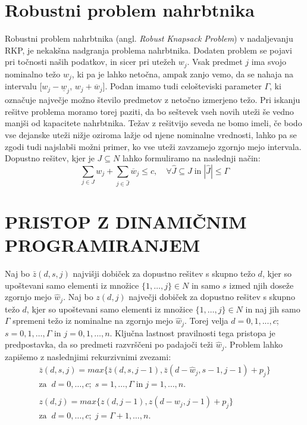 \documentclass[a4paper,12pt]{article}
\begin{document}
\section{Robustni problem nahrbtnika}
\medskip
Robustni problem nahrbtnika (angl. \textit{Robust Knapsack Problem}) v nadaljevanju 
RKP, je nekakšna nadgranja problema nahrbtnika. Dodaten problem se pojavi pri točnosti 
naših podatkov, in sicer pri utežeh $w_{j}$. Vsak predmet $j$ ima svojo nominalno težo 
$w_{j}$, ki pa je lahko netočna, ampak zanjo vemo, da se nahaja na intervalu 
[$w_{j} - \underline{w}_{j}$, $w_{j} + \overline{w}_{j}$]. Podan imamo tudi celošteviski parameter $\Gamma$,
ki označuje največje možno število predmetov z netočno izmerjeno težo. Pri iskanju 
rešitve problema moramo torej paziti, da bo seštevek vseh novih uteži še vedno manjši od
kapacitete nahrbtnika. Težav z rešitvijo seveda ne bomo imeli, če bodo vse dejanske uteži
nižje oziroma lažje od njene nominalne vrednosti, lahko pa se zgodi tudi najslabši možni 
primer, ko vse uteži zavzamejo zgornjo mejo intervala. Dopustno rešitev, kjer je
$J \subseteq N$ lahko formuliramo na naslednji način: 
\begin{equation}
    \tag*{}
    \sum_{j \in J}w_{j} + \sum_{j \in \hat{J}}\overline{w}_{j} \leq c,\quad \forall \hat{J} \subseteq J \; \text{in}\; |\hat{J}| \leq \Gamma 
\end{equation}


\section{PRISTOP Z DINAMIČNIM PROGRAMIRANJEM}

Naj bo $ \bar{z}(d, s, j) $ najvišji dobiček za dopustno rešitev s skupno težo $d$, kjer so upoštevani 
samo elementi iz množice $ \{1,…,j\} \in N$ in samo $s$ izmed njih doseže zgornjo mejo $\hat{w}_j$. 
Naj bo $z(d, j)$ največji dobiček za dopustno rešitev s skupno težo $d$, kjer so upoštevani samo elementi 
iz množice $\{ 1,…,j \} \in N $ in naj jih samo $\Gamma $ spremeni težo iz nominalne na zgornjo mejo $\hat{w}_j$. 
Torej velja $d = 0, 1, ..., c$; $s = 0, 1, …, \Gamma$ in $ j = 0, 1, …, n$.
Ključna lastnost pravilnosti tega pristopa je predpostavka, da so predmeti razvrščeni po padajoči teži $\hat{w}_j$. 
Problem lahko zapišemo z naslednjimi rekurzivnimi zvezami: 
\begin{equation}
    \tag*{}
    \begin{matrix}
    \bar{z}(d, s, j) = max\{ \bar{z}(d, s, j - 1), \bar{z}(d - \hat{w}_j, s- 1, j - 1) + p_j\} \\
    \text{za} \; \; d = 0,…, c; \; s = 1,…, \Gamma \;\text{in} \;j = 1,…, n. \\ 
    \\
    z(d, j) = max\{z(d, j - 1), z (d - w_j, j - 1) + p_j\} \\
    \text{za} \; \; d = 0,…, c; \; j = \Gamma + 1,…, n.
    \end{matrix}
\end{equation}
\end{document}
